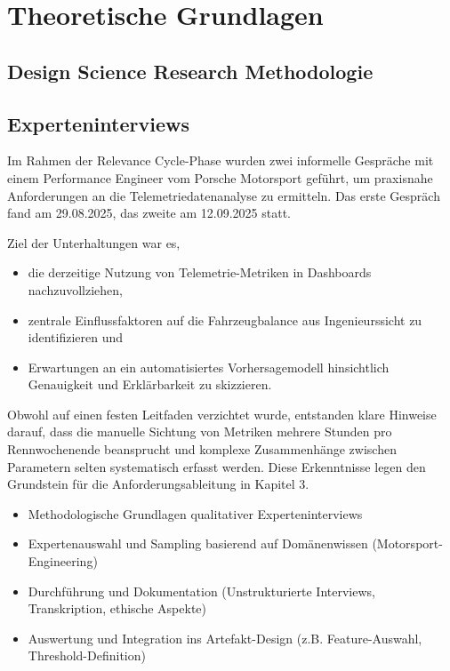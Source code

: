 \chapter{Theoretische Grundlagen}
\section{Design Science Research Methodologie}
\section{Experteninterviews}

Im Rahmen der Relevance Cycle-Phase wurden zwei informelle Gespräche mit einem Performance Engineer vom Porsche Motorsport geführt, um praxisnahe Anforderungen an die Telemetriedatenanalyse zu ermitteln. Das erste Gespräch fand am 29.08.2025, das zweite am 12.09.2025 statt.

Ziel der Unterhaltungen war es,  
\begin{itemize}
  \item die derzeitige Nutzung von Telemetrie-Metriken in Dashboards nachzuvollziehen,  
  \item zentrale Einflussfaktoren auf die Fahrzeugbalance aus Ingenieurssicht zu identifizieren und  
  \item Erwartungen an ein automatisiertes Vorhersagemodell hinsichtlich Genauigkeit und Erklärbarkeit zu skizzieren.  
\end{itemize}

Obwohl auf einen festen Leitfaden verzichtet wurde, entstanden klare Hinweise darauf, dass die manuelle Sichtung von Metriken mehrere Stunden pro Rennwochenende beansprucht und komplexe Zusammenhänge zwischen Parametern selten systematisch erfasst werden. Diese Erkenntnisse legen den Grundstein für die Anforderungsableitung in Kapitel 3.  

\begin{itemize}
  \item Methodologische Grundlagen qualitativer Experteninterviews
  \item Expertenauswahl und Sampling basierend auf Domänenwissen (Motorsport-Engineering)
  \item Durchführung und Dokumentation (Unstrukturierte Interviews, Transkription, ethische Aspekte)
  \item Auswertung und Integration ins Artefakt-Design (z.B. Feature-Auswahl, Threshold-Definition)
\end{itemize}

